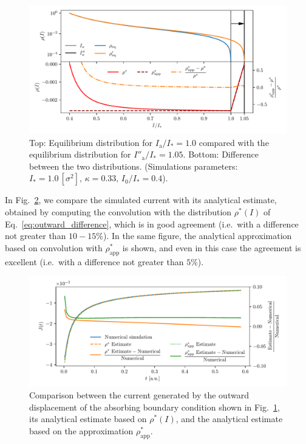 \begin{figure}[t]
    \centering
    \includegraphics[width=\textwidth]{4_probing_the_diffusive_behavior/figs/final/difference_outwards_s.pdf}
    \caption{Top: Equilibrium distribution for $I_\mathrm{a}/I_\ast = 1.0$ compared with the equilibrium distribution for $I''_\mathrm{a}/I_\ast = 1.05$. Bottom: Difference between the two distributions. (Simulations parameters: $I_\ast = 1.0\,[\sigma^2],\, \kappa = 0.33,\, I_0/I_\ast = 0.4$).}
    \label{fig:6}
\end{figure}

In Fig.~\ref{fig:7}, we compare the simulated current with its analytical estimate, obtained by computing the convolution with the distribution $\rho^\ast(I)$ of Eq.~\eqref{eq:outward_difference}, which is in good agreement {(i.e.\ with a difference not greater than $10-15\%$)}. In the same figure, the analytical approximation based on convolution with $\rho^\ast_\text{app}$ is shown, and even in this case the agreement is excellent {(i.e.\ with a difference not greater than $5\%$)}.

\begin{figure}[t]
    \centering
    \includegraphics[width=\textwidth]{4_probing_the_diffusive_behavior/figs/final/current_outwards.pdf}
    \caption{Comparison between the current generated by the outward displacement of the absorbing boundary condition shown in Fig.~\ref{fig:6}, its analytical estimate based on $\rho^\ast(I)$, and the analytical estimate based on the approximation $\rho^\ast_\text{app}$.}
    \label{fig:7}
\end{figure}

